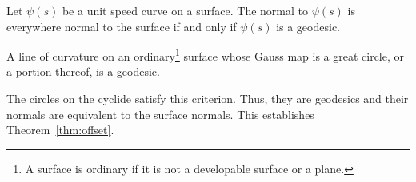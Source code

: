
\begin{lemma}
\cite{MP77}
Let $\psi(s)$ be a unit speed curve on a surface.
The normal to $\psi(s)$ is everywhere normal to the surface if and only if
$\psi(s)$ is a geodesic.
\end{lemma}

\begin{lemma}
\label{lem:grau}
\cite{GRAU47}
A line of curvature on an ordinary\footnote{A surface is ordinary if it
	is not a developable surface or a plane.}
surface whose Gauss map is a great circle, or a portion thereof, is a geodesic.
\end{lemma}



The circles on the cyclide satisfy this criterion.
Thus, they are geodesics and their normals are equivalent to the surface
normals.
This establishes Theorem~\ref{thm:offset}.








